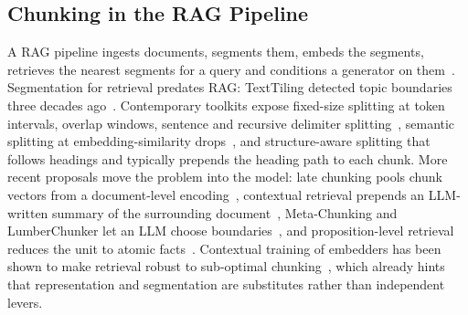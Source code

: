 \documentclass[runningheads]{llncs}
\begin{document}
\subsection{Chunking in the RAG Pipeline}
A RAG pipeline ingests documents, segments them, embeds the segments, retrieves the nearest segments for a query and conditions a generator on them~\cite{lewis2020rag,karpukhin2020dpr}. Segmentation for retrieval predates RAG: TextTiling detected topic boundaries three decades ago~\cite{hearst1997texttiling}. Contemporary toolkits expose fixed-size splitting at token intervals, overlap windows, sentence and recursive delimiter splitting~\cite{langchain2023}, semantic splitting at embedding-similarity drops~\cite{kamradt2023}, and structure-aware splitting that follows headings and typically prepends the heading path to each chunk. More recent proposals move the problem into the model: late chunking pools chunk vectors from a document-level encoding~\cite{gunther2024latechunking}, contextual retrieval prepends an LLM-written summary of the surrounding document~\cite{anthropic2024contextual}, Meta-Chunking and LumberChunker let an LLM choose boundaries~\cite{zhao2024metachunking,duarte2024lumberchunker}, and proposition-level retrieval reduces the unit to atomic facts~\cite{chen2024densex}. Contextual training of embedders has been shown to make retrieval robust to sub-optimal chunking~\cite{conti2025conteb}, which already hints that representation and segmentation are substitutes rather than independent levers.
\end{document}
